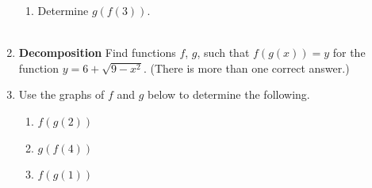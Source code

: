 \documentclass[11pt]{article}
\begin{document}
\begin{enumerate}
\begin{enumerate}
\item Determine $g(f(3))$. \\ \\
\end{enumerate}



\newpage

\item \textbf{Decomposition}  Find functions $f$, $g$, such that $f(g(x))=y$ for the function $y = 6 + \sqrt{9-x^2}$. (There is more than one correct answer.) \\[1in]

\item Use the graphs of $f$ and $g$ below to determine the following.
\begin{enumerate}
\item $f (g(2))$  \\[.5in] 
\item $g(f(4))$  \\[.5in] 
\item $f(g(1))$ \\[.5in] 

\end{enumerate}



\end{enumerate}
\end{document}
